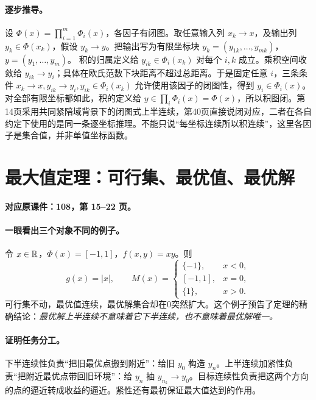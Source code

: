 \paragraph{逐步推导。}
设 $\Phi(x)=\prod_{i=1}^m\Phi_i(x)$，各因子有闭图。取任意输入列 $x_k\to x$，及输出列 $y_k\in\Phi(x_k)$，假设 $y_k\to y$。把输出写为有限坐标块 $y_k=(y_{1k},\ldots,y_{mk})$，$y=(y_1,\ldots,y_m)$。
积的归属定义给 $y_{ik}\in\Phi_i(x_k)$ 对每个 $i,k$ 成立。乘积空间收敛给 $y_{ik}\to y_i$；具体在欧氏范数下块距离不超过总距离。于是固定任意 $i$，三条条件 $x_k\to x,y_{ik}\to y_i,y_{ik}\in\Phi_i(x_k)$ 允许使用该因子的闭图性，得到 $y_i\in\Phi_i(x)$。
对全部有限坐标都如此，积的定义给 $y\in\prod_i\Phi_i(x)=\Phi(x)$，所以积图闭。第14页采用共同紧陪域背景下的闭图式上半连续，第40页直接说闭对应，二者在各自约定下使用的是同一条逐坐标推理。不能只说“每坐标连续所以积连续”，这里各因子是集合值，并非单值坐标函数。


\clearpage\section{最大值定理：可行集、最优值、最优解}\label{g:108:15}

\textbf{对应原课件：108，第 15--22 页。}


\paragraph{一眼看出三个对象不同的例子。}
令 $x\in\mathbb{R}$，$\Phi(x)=[-1,1]$，$f(x,y)=xy$。则
\[g(x)=|x|,\qquad M(x)=
\begin{cases}\{-1\},&x<0,\\{[-1,1]},&x=0,\\\{1\},&x>0.\end{cases}\]
可行集不动，最优值连续，最优解集合却在0突然扩大。这个例子预告了定理的精确结论：\emph{最优解上半连续不意味着它下半连续，也不意味着最优解唯一。}
\paragraph{证明任务分工。}
下半连续性负责“把旧最优点搬到附近”：给旧 $y_0$ 构造 $y_n$。上半连续加紧性负责“把附近最优点带回旧环境”：给 $y_n$ 抽 $y_{n_k}\to y_0$。目标连续性负责把这两个方向的点的逼近转成收益的逼近。紧性还有最初保证最大值达到的作用。

